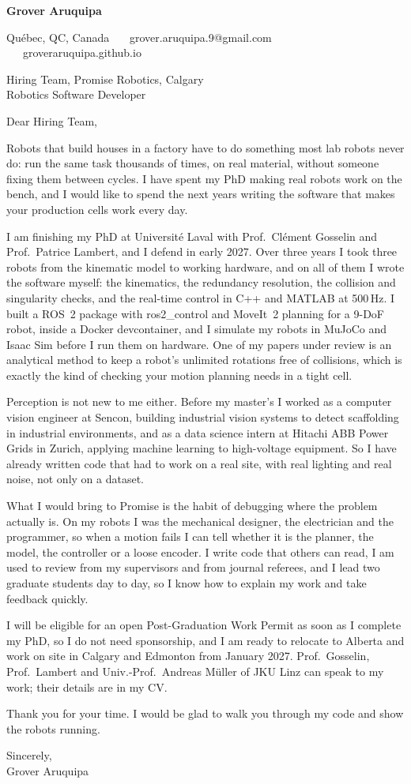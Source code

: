 \documentclass[11pt,letterpaper]{article}
\begin{document}
{\large\bfseries Grover Aruquipa}\par\vspace{-6pt}
{\small Qu\'ebec, QC, Canada \ \textbullet\ \ grover.aruquipa.9@gmail.com \ \textbullet\ \ groveraruquipa.github.io}

\vspace{4pt}
Hiring Team, Promise Robotics, Calgary\\
Robotics Software Developer

Dear Hiring Team,

Robots that build houses in a factory have to do something most lab robots never do: run the same task thousands of times, on real material, without someone fixing them between cycles. I have spent my PhD making real robots work on the bench, and I would like to spend the next years writing the software that makes your production cells work every day.

I am finishing my PhD at Universit\'e Laval with Prof.\ Cl\'ement Gosselin and Prof.\ Patrice Lambert, and I defend in early 2027. Over three years I took three robots from the kinematic model to working hardware, and on all of them I wrote the software myself: the kinematics, the redundancy resolution, the collision and singularity checks, and the real-time control in C++ and MATLAB at 500\,Hz. I built a ROS~2 package with ros2\_control and MoveIt~2 planning for a 9-DoF robot, inside a Docker devcontainer, and I simulate my robots in MuJoCo and Isaac Sim before I run them on hardware. One of my papers under review is an analytical method to keep a robot's unlimited rotations free of collisions, which is exactly the kind of checking your motion planning needs in a tight cell.

Perception is not new to me either. Before my master's I worked as a computer vision engineer at Sencon, building industrial vision systems to detect scaffolding in industrial environments, and as a data science intern at Hitachi ABB Power Grids in Zurich, applying machine learning to high-voltage equipment. So I have already written code that had to work on a real site, with real lighting and real noise, not only on a dataset.

What I would bring to Promise is the habit of debugging where the problem actually is. On my robots I was the mechanical designer, the electrician and the programmer, so when a motion fails I can tell whether it is the planner, the model, the controller or a loose encoder. I write code that others can read, I am used to review from my supervisors and from journal referees, and I lead two graduate students day to day, so I know how to explain my work and take feedback quickly.

I will be eligible for an open Post-Graduation Work Permit as soon as I complete my PhD, so I do not need sponsorship, and I am ready to relocate to Alberta and work on site in Calgary and Edmonton from January 2027. Prof.\ Gosselin, Prof.\ Lambert and Univ.-Prof.\ Andreas M\"uller of JKU Linz can speak to my work; their details are in my CV.

Thank you for your time. I would be glad to walk you through my code and show the robots running.

Sincerely,\\
Grover Aruquipa
\end{document}
